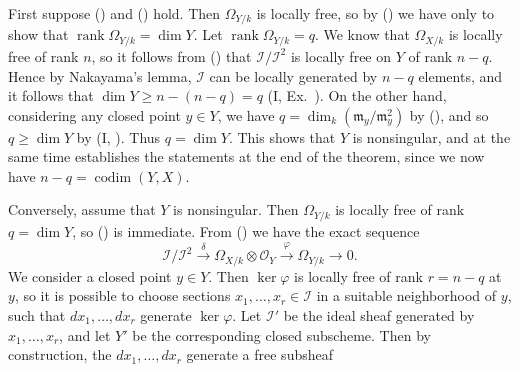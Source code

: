 {\Proof First suppose () and () hold. Then $\Omega_{Y/k}$ is locally free, so by () we have only to show that $\operatorname{rank}\Omega_{Y/k}=\dim Y$. Let $\operatorname{rank}\Omega_{Y/k}=q$. We know that $\Omega_{X/k}$ is locally free of rank $n$, so it follows from () that $\mathcal I/\mathcal I^2$ is locally free on $Y$ of rank $n-q$. Hence by Nakayama's lemma, $\mathcal I$ can be locally generated by $n-q$ elements, and it follows that $\dim Y\ge n-(n-q)=q$ (I, Ex.~). On the other hand, considering any closed point $y\in Y$, we have $q=\dim_k(\mathfrak m_y/\mathfrak m_y^2)$ by (), and so $q\ge\dim Y$ by (I, ). Thus $q=\dim Y$. This shows that $Y$ is nonsingular, and at the same time establishes the statements at the end of the theorem, since we now have $n-q=\operatorname{codim}(Y,X)$.

Conversely, assume that $Y$ is nonsingular. Then $\Omega_{Y/k}$ is locally free of rank $q=\dim Y$, so () is immediate. From () we have the exact sequence
\[
\mathcal I/\mathcal I^2\xrightarrow{\delta}\Omega_{X/k}\otimes\mathcal O_Y
  \xrightarrow{\varphi}\Omega_{Y/k}\longrightarrow0.
\]
\noindent We consider a closed point $y\in Y$. Then $\ker\varphi$ is locally free of rank $r=n-q$ at $y$, so it is possible to choose sections $x_1,\ldots,x_r\in\mathcal I$ in a suitable neighborhood of $y$, such that $dx_1,\ldots,dx_r$ generate $\ker\varphi$. Let $\mathcal I'$ be the ideal sheaf generated by $x_1,\ldots,x_r$, and let $Y'$ be the corresponding closed subscheme. Then by construction, the $dx_1,\ldots,dx_r$ generate a free subsheaf
}
